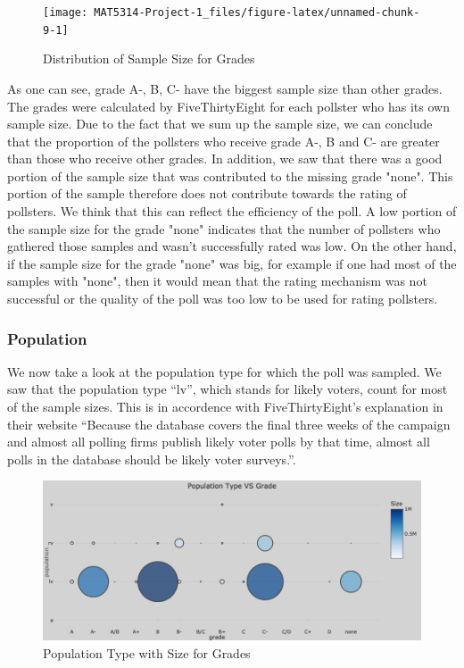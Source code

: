 \documentclass[
  12pt,
]{article}
\begin{document}
\begin{minipage}[t]{0.5\textwidth}
\begin{figure}
\texttt{[image: MAT5314-Project-1\_files/figure-latex/unnamed-chunk-9-1]} \caption{Distribution of Sample Size for Grades}\label{fig:unnamed-chunk-9}
\end{figure}
\end{minipage}
\begin{minipage}[t]{0.5\textwidth}
\vspace{0pt}
As one can see, grade A-, B, C- have the biggest sample size than other grades. The grades were calculated by FiveThirtyEight for each pollster who has its own sample size. Due to the fact that we sum up the sample size, we can conclude that the proportion of the pollsters who receive grade A-, B and C- are greater than those who receive other grades. In addition, we saw that there was a good portion of the sample size that was contributed to the missing grade "none". This portion of the sample therefore does not contribute towards the rating of pollsters. We think that this can reflect the efficiency of the poll. A low portion of the sample size for the grade "none" indicates that the number of pollsters who gathered those samples and wasn't successfully rated was low. On the other hand, if the sample size for the grade "none" was big, for example if one had most of the samples with "none", then it would mean that the rating mechanism was not successful or the quality of the poll was too low to be used for rating pollsters.
\end{minipage}

\hypertarget{population}{%
\subsubsection{Population}\label{population}}

We now take a look at the population type for which the poll was
sampled. We saw that the population type ``lv'', which stands for likely
voters, count for most of the sample sizes. This is in accordence with
FiveThirtyEight's explanation in their website ``Because the database
covers the final three weeks of the campaign and almost all polling
firms publish likely voter polls by that time, almost all polls in the
database should be likely voter surveys.''.

\begin{figure}
\centering
\includegraphics{./Figures/popChart.png}
\caption{Population Type with Size for Grades}
\end{figure}
\end{document}
